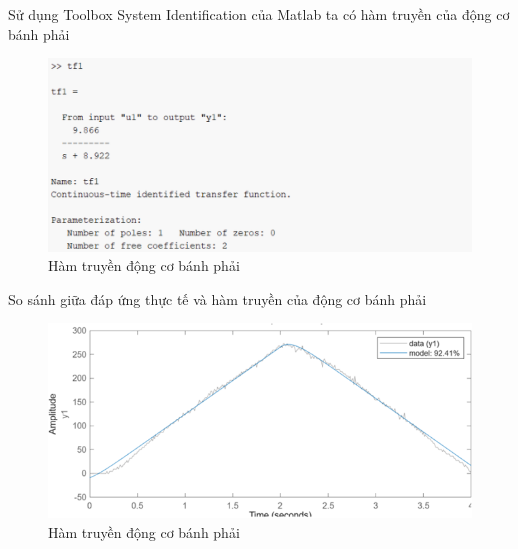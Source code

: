                \hspace*{0.6cm}Sử dụng Toolbox System Identification của Matlab ta có hàm truyền của động cơ bánh phải 
               \begin{figure}[H]
                    \centering
                    \includegraphics[width=1\textwidth]{pictures/chapter5/CJGB1_tf.png}
                    \caption{Hàm truyền động cơ bánh phải}
                    \label{CJGB1_tf}
               \end{figure} 
               \hspace*{0.6cm}So sánh giữa đáp ứng thực tế và hàm truyền của động cơ bánh phải
               \begin{figure}[H]
                    \centering
                    \includegraphics[width=1\textwidth]{pictures/chapter5/CJGB1_compare.png}
                    \caption{Hàm truyền động cơ bánh phải}
                    \label{CJGB1_compare}
               \end{figure} 
